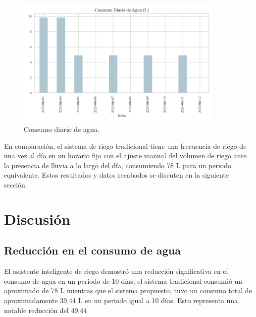 \documentclass[pdflatex,sn-mathphys-num]{sn-jnl}%
\theoremstyle{thmstyleone}%
\theoremstyle{thmstyletwo}%
\theoremstyle{thmstylethree}%
\begin{document}
\begin{figure}
  \centering
  \includegraphics[width=0.9\textwidth]{assets/consumo_diario.png}
  \caption{Consumo diario de agua.}
  \label{fig6}
\end{figure}

En comparación, el sistema de riego tradicional tiene una frecuencia de riego de una vez al día en un horario fijo con el ajuste manual del volumen de riego ante la presencia de lluvia a lo largo del día, consumiendo 78 L para un periodo equivalente. Estos resultados y datos recabados se discuten en la siguiente sección.

\section{Discusión}

\subsection{Reducción en el consumo de agua}

El asistente inteligente de riego demostró una reducción significativa en el consumo de agua en un periodo de 10 días, el sistema tradicional consumió un aproximado de 78 L mientras que el sistema propuesto, tuvo un consumo total de aproximadamente 39.44 L en un periodo igual a 10 días. Esto representa una notable reducción del 49.44%
\end{document}
